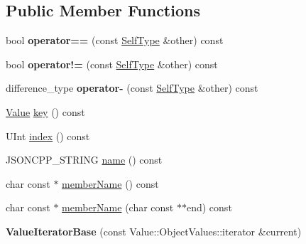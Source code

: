 \subsection*{Public Member Functions}
\begin{DoxyCompactItemize}
\item 
\mbox{\label{classJson_1_1ValueIteratorBase_a1248d8016f88b51371a0fcbd355b3cfd}} 
bool {\bfseries operator==} (const \hyperlink{classJson_1_1ValueIteratorBase}{Self\+Type} \&other) const
\item 
\mbox{\label{classJson_1_1ValueIteratorBase_aa83bdcc8114b7d040eb8eb42eeed5f4a}} 
bool {\bfseries operator!=} (const \hyperlink{classJson_1_1ValueIteratorBase}{Self\+Type} \&other) const
\item 
\mbox{\label{classJson_1_1ValueIteratorBase_a98e254263fca5f1fc8fcac7bcb0260bf}} 
difference\+\_\+type {\bfseries operator-\/} (const \hyperlink{classJson_1_1ValueIteratorBase}{Self\+Type} \&other) const
\item 
\hyperlink{classJson_1_1Value}{Value} \hyperlink{classJson_1_1ValueIteratorBase_a3838ba39c43c518cf3ed4aa6ce78ccad}{key} () const
\item 
U\+Int \hyperlink{classJson_1_1ValueIteratorBase_a549c66a0bd20e9ae772175a5c0d2e88a}{index} () const
\item 
J\+S\+O\+N\+C\+P\+P\+\_\+\+S\+T\+R\+I\+NG \hyperlink{classJson_1_1ValueIteratorBase_a522989403c976fdbb94da846b99418db}{name} () const
\item 
char const  $\ast$ \hyperlink{classJson_1_1ValueIteratorBase_a54765da6759fd3f1edcbfbaf308ec263}{member\+Name} () const
\item 
char const  $\ast$ \hyperlink{classJson_1_1ValueIteratorBase_a391c9cbd0edf9a447b37df00e8ce6059}{member\+Name} (char const $\ast$$\ast$end) const
\item 
\mbox{\label{classJson_1_1ValueIteratorBase_a640e990e5f03a96fd650122a2906f59d}} 
{\bfseries Value\+Iterator\+Base} (const Value\+::\+Object\+Values\+::iterator \&current)
\end{DoxyCompactItemize}
